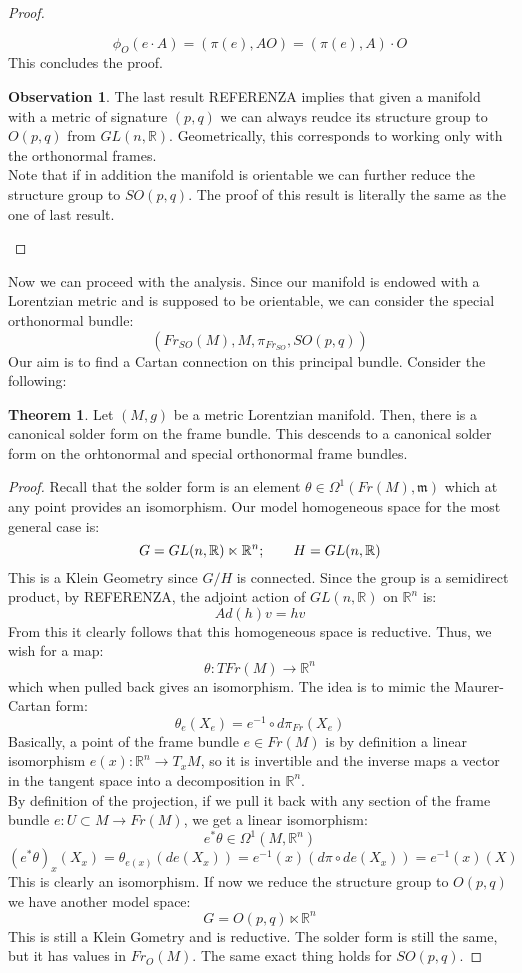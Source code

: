 \documentclass[12pt,a4paper]{report}
\theoremstyle{definition}
\theoremstyle{Theorem}
\newtheorem{Theo}[Def]{Theorem}
\theoremstyle{definition}
\theoremstyle{definition}
\newtheorem{Obs}[Def]{Observation}
\begin{document}
\begin{proof}
\begin{itemize}
				$$\phi_O(e\cdot A)=(\pi(e),AO)=(\pi(e),A)\cdot O$$
				This concludes the proof.
			\end{itemize}
			\begin{Obs}
				The last result REFERENZA implies that given a manifold with a metric of signature $(p,q)$ we can always reudce its structure group to $O(p,q)$ from $GL(n,\mathbb{R})$. Geometrically, this corresponds to working only with the orthonormal frames.\\
				Note that if in addition the manifold is orientable we can further reduce the structure group to $SO(p,q)$. The proof of this result is literally the same as the one of last result.
			\end{Obs}
		\end{proof}
		Now we can proceed with the analysis. Since our manifold is endowed with a Lorentzian metric and is supposed to be orientable, we can consider the special orthonormal bundle:
		$$(Fr_{SO}(M),M,\pi_{Fr_{SO}},SO(p,q))$$
		Our aim is to find a Cartan connection on this principal bundle. Consider the following:
		\begin{Theo}
			Let $(M,g)$ be a metric Lorentzian manifold. Then, there is a canonical solder form on the frame bundle. This descends to a canonical solder form on the orhtonormal and special orthonormal frame bundles.
		\end{Theo}
		\begin{proof}
			Recall that the solder form is an element $\theta\in\Omega^1(Fr(M),\mathfrak{m})$ which at any point provides an isomorphism. Our model homogeneous space for the most general case is:
			$$G=GL(n,\mathbb{R})\ltimes\mathbb{R}^n;\hspace{20 pt}H=GL(n,\mathbb{R})$$
			This is a Klein Geometry since $G/H$ is connected. Since the group is a semidirect product, by REFERENZA, the adjoint action of $GL(n,\mathbb{R})$ on $\mathbb{R}^n$ is:
			$$Ad(h)v=hv$$
			From this it clearly follows that this homogeneous space is reductive. Thus, we wish for a map:
			$$\theta:TFr(M)\rightarrow \mathbb{R}^n$$
			which when pulled back gives an isomorphism. The idea is to mimic the Maurer-Cartan form:
			$$\theta_e(X_e)=e^{-1}\circ d\pi_{Fr}(X_e)$$
			Basically, a point of the frame bundle $e\in Fr(M)$ is by definition a linear isomorphism $e(x):\mathbb{R}^n\rightarrow T_xM$, so it is invertible and the inverse maps a vector in the tangent space into a decomposition in $\mathbb{R}^n$. \\
			By definition of the projection, if we pull it back with any section of the frame bundle $e:U\subset M\rightarrow Fr(M)$, we get a linear isomorphism:
			$$e^*\theta\in\Omega^1(M,\mathbb{R}^n)$$
			$$(e^*\theta)_x(X_x)=\theta_{e(x)}(de(X_x))=e^{-1}(x)(d\pi\circ de(X_x))=e^{-1}(x)(X)$$
			This is clearly an isomorphism. If now we reduce the structure group to $O(p,q)$ we have another model space:
			$$G=O(p,q)\ltimes \mathbb{R}^n$$
			This is still a Klein Gometry and is reductive. The solder form is still the same, but it has values in $Fr_O(M)$. The same exact thing holds for $SO(p,q)$.
		\end{proof}
\end{document}
